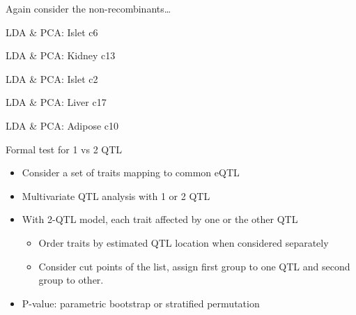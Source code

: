 \documentclass[12pt,t]{beamer}
\begin{document}
\begin{frame}[c]{}
\centerline{\Large \ticolor Again consider the non-recombinants\dots}

\note{
}

\end{frame}


\begin{frame}[c]{LDA \& PCA: Islet c6}

\note{
}

\end{frame}

\begin{frame}[c]{LDA \& PCA: Kidney c13}

\note{
}

\end{frame}

\begin{frame}[c]{LDA \& PCA: Islet c2}

\note{
}

\end{frame}

\begin{frame}[c]{LDA \& PCA: Liver c17}

\note{
}

\end{frame}

\begin{frame}[c]{LDA \& PCA: Adipose c10}

\note{
}

\end{frame}





\begin{frame}[c]{Formal test for 1 vs 2 QTL}

  \begin{itemize}
  \itemsep12pt
  \item Consider a set of traits mapping to common eQTL
  \item Multivariate QTL analysis with 1 or 2 QTL
  \item With 2-QTL model, each trait affected by one or the other QTL
    \vspace*{8pt}
    \begin{itemize}
      \itemsep8pt
      \item Order traits by estimated QTL location when considered
        separately
      \item Consider cut points of the list, assign first group to one
        QTL and second group to other.
    \end{itemize}
  \item P-value: parametric bootstrap or stratified permutation
  \end{itemize}

\note{
}

\end{frame}
\end{document}
